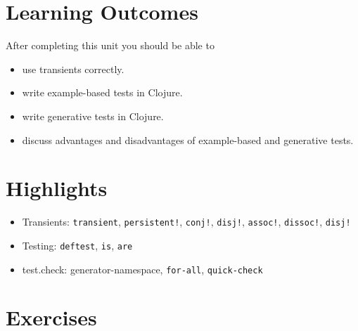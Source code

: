\documentclass[11pt,a4paper]{article}
\begin{document}
\section{Learning Outcomes}

After completing this unit you should be able to

\begin{itemize}
    \item use transients correctly.
    \item write example-based tests in Clojure.
    \item write generative tests in Clojure.
    \item discuss advantages and disadvantages of example-based and generative tests.
\end{itemize}

\section{Highlights}

\begin{itemize}
    \item Transients: \verb|transient|, \verb|persistent!|, \verb|conj!|, \verb|disj!|, \verb|assoc!|, \verb|dissoc!|, \verb|disj!|
    \item Testing: \verb|deftest|, \verb|is|, \verb|are|
    \item test.check: generator-namespace, \verb|for-all|, \verb|quick-check|
\end{itemize}



\section{Exercises}
\end{document}
